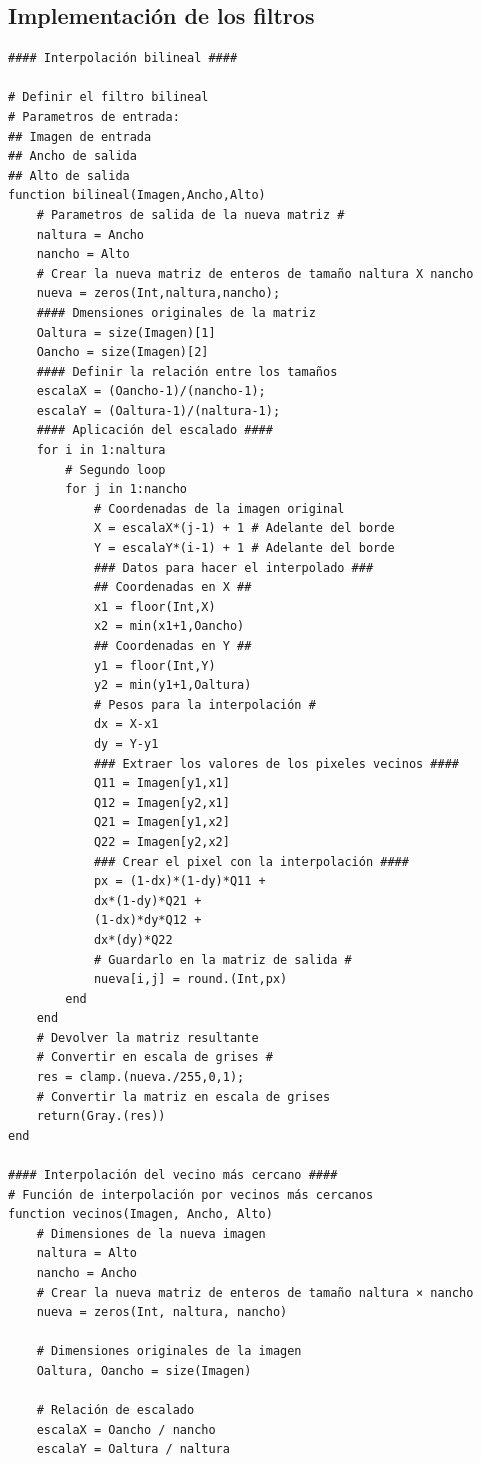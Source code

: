 \documentclass[11pt, letterpaper]{article}
\begin{document}
	
	\subsection{Implementación de los filtros}
	
	
\begin{itemize}
	\begin{verbatim}
#### Interpolación bilineal ####
		
# Definir el filtro bilineal
# Parametros de entrada: 
## Imagen de entrada
## Ancho de salida
## Alto de salida
function bilineal(Imagen,Ancho,Alto) 
	# Parametros de salida de la nueva matriz #
	naltura = Ancho
	nancho = Alto
	# Crear la nueva matriz de enteros de tamaño naltura X nancho
	nueva = zeros(Int,naltura,nancho);
	#### Dmensiones originales de la matriz
	Oaltura = size(Imagen)[1]
	Oancho = size(Imagen)[2]
	#### Definir la relación entre los tamaños
	escalaX = (Oancho-1)/(nancho-1);
	escalaY = (Oaltura-1)/(naltura-1);
	#### Aplicación del escalado ####
	for i in 1:naltura
		# Segundo loop
		for j in 1:nancho
			# Coordenadas de la imagen original
			X = escalaX*(j-1) + 1 # Adelante del borde
			Y = escalaY*(i-1) + 1 # Adelante del borde
			### Datos para hacer el interpolado ###
			## Coordenadas en X ##
			x1 = floor(Int,X)
			x2 = min(x1+1,Oancho)
			## Coordenadas en Y ##
			y1 = floor(Int,Y)
			y2 = min(y1+1,Oaltura)
			# Pesos para la interpolación #
			dx = X-x1
			dy = Y-y1
			### Extraer los valores de los pixeles vecinos ####
			Q11 = Imagen[y1,x1]
			Q12 = Imagen[y2,x1]
			Q21 = Imagen[y1,x2]
			Q22 = Imagen[y2,x2]
			### Crear el pixel con la interpolación ####
			px = (1-dx)*(1-dy)*Q11 +
			dx*(1-dy)*Q21 +
			(1-dx)*dy*Q12 +
			dx*(dy)*Q22
			# Guardarlo en la matriz de salida #
			nueva[i,j] = round.(Int,px)
		end
	end
	# Devolver la matriz resultante
	# Convertir en escala de grises #
	res = clamp.(nueva./255,0,1);
	# Convertir la matriz en escala de grises
	return(Gray.(res)) 
end
		
#### Interpolación del vecino más cercano ####	
# Función de interpolación por vecinos más cercanos
function vecinos(Imagen, Ancho, Alto)
	# Dimensiones de la nueva imagen
	naltura = Alto
	nancho = Ancho
	# Crear la nueva matriz de enteros de tamaño naltura × nancho
	nueva = zeros(Int, naltura, nancho)
		
	# Dimensiones originales de la imagen
	Oaltura, Oancho = size(Imagen)
		
	# Relación de escalado
	escalaX = Oancho / nancho
	escalaY = Oaltura / naltura
		

\end{verbatim}
\end{itemize}
\end{document}
